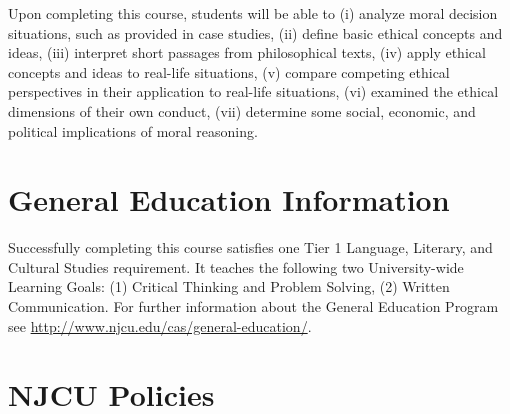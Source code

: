 \documentclass[article,oneside]{memoir}
\begin{document}
Upon completing this course, students will be able to (i) analyze moral decision situations, such as provided in case studies, (ii) define basic ethical concepts and ideas, (iii) interpret short passages from philosophical texts, (iv) apply ethical concepts and ideas to real-life situations, (v) compare competing ethical perspectives in their application to real-life situations,  (vi) examined the ethical dimensions of their own conduct, (vii) determine some social, economic, and political implications of moral reasoning.


\section{General Education Information} 
Successfully completing this course satisfies one Tier 1 Language, Literary, and Cultural Studies requirement. It teaches the following two University-wide Learning Goals: (1) Critical Thinking and Problem Solving, (2) Written Communication. For further information about the General Education Program see \href{http://www.njcu.edu/cas/general-education/}{http://www.njcu.edu/cas/general-education/}.









\section{NJCU Policies}
\end{document}
